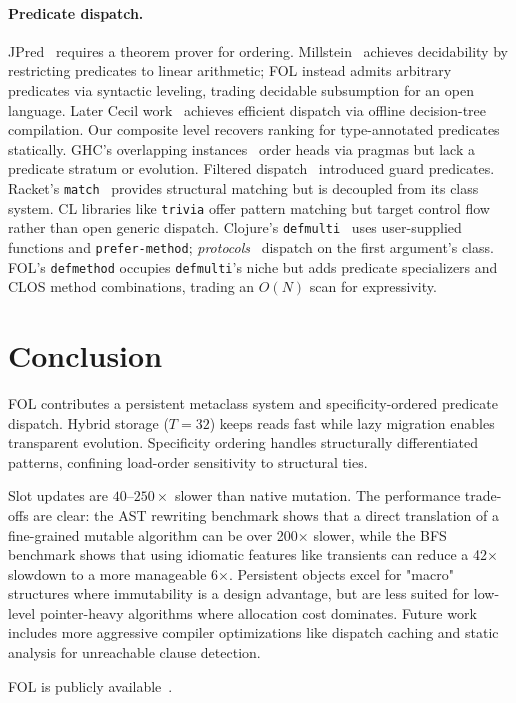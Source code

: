\documentclass[sigconf,nonacm]{acmart}
\begin{document}
\paragraph{Predicate dispatch.}
JPred~\cite{Ernst1998} requires a theorem prover for ordering. Millstein~\cite{Millstein2004} achieves decidability by restricting predicates to linear arithmetic;
FOL instead admits arbitrary predicates via syntactic leveling, trading decidable subsumption for an open language.
Later Cecil work~\cite{Chambers1999} achieves efficient dispatch via offline decision-tree compilation.
Our composite level recovers ranking for type-annotated predicates statically.
GHC's overlapping instances~\cite{PeytonJones2004} order heads via pragmas but lack a predicate stratum or evolution.
Filtered dispatch~\cite{Orleans2002} introduced guard predicates.
Racket's \texttt{match}~\cite{flatt:manifesto} provides structural matching but is decoupled from its class system.
CL libraries like \texttt{trivia} offer pattern matching but target control flow rather than open generic dispatch.
Clojure's \texttt{defmulti}~\cite{Hickey2008} uses user-supplied functions and \texttt{prefer-method}; \textit{protocols}~\cite{Hickey2010protocols} dispatch on the first argument's class.
FOL's \texttt{defmethod} occupies \texttt{defmulti}'s niche but adds predicate specializers and CLOS method combinations, trading an $O(N)$ scan for expressivity.

\section{Conclusion}
\label{sec:conclusion}

FOL contributes a persistent metaclass system and specificity-ordered predicate dispatch.
Hybrid storage ($T=32$) keeps reads fast while lazy migration enables transparent evolution.
Specificity ordering handles structurally differentiated patterns, confining load-order sensitivity to structural ties.

Slot updates are $40$--$250{\times}$ slower than native mutation. The performance trade-offs are clear: the AST rewriting benchmark shows that a direct translation of a fine-grained mutable algorithm can be over 200$\times$ slower, while the BFS benchmark shows that using idiomatic features like transients can reduce a 42$\times$ slowdown to a more manageable 6$\times$.
Persistent objects excel for "macro" structures where immutability is a design advantage, but are less suited for low-level pointer-heavy algorithms where allocation cost dominates.
Future work includes more aggressive compiler optimizations like dispatch caching and static analysis for unreachable clause detection.

FOL is publicly available~\cite{fol2026}.

\balance



\end{document}
